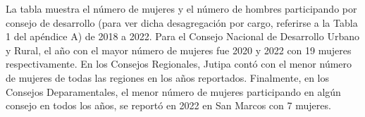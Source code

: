 La tabla muestra el número de mujeres y el número de hombres participando por consejo de desarrollo (para ver dicha desagregación por cargo, referirse a la Tabla 1 del apéndice A) de  2018 a 2022. Para el Consejo Nacional de Desarrollo Urbano y Rural, el año con el mayor número de mujeres fue 2020 y 2022 con 19 mujeres respectivamente. En los Consejos Regionales, Jutipa contó con el menor número de mujeres de todas  las regiones en los años reportados. Finalmente, en los Consejos Deparamentales, el menor número de mujeres participando en algún consejo en todos los años, se reportó en 2022 en San Marcos con 7 mujeres. 